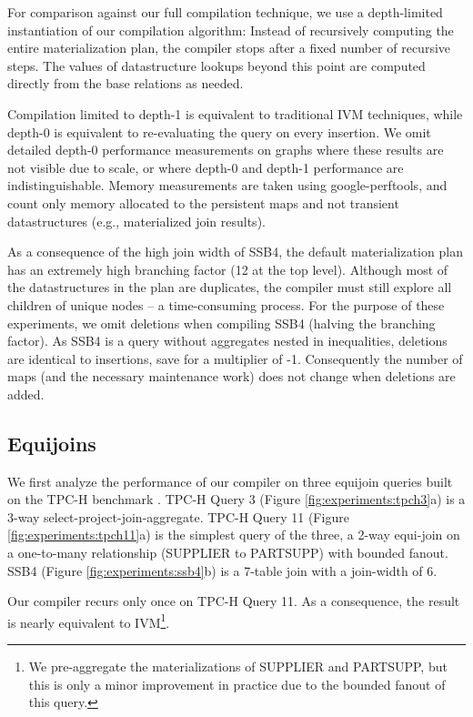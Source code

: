 For comparison against our full compilation technique, we use a depth-limited instantiation of our compilation algorithm: Instead of recursively computing the entire materialization plan, the compiler stops after a fixed number of recursive steps.  The values of datastructure lookups beyond this point are computed directly from the base relations as needed.

Compilation limited to depth-1 is equivalent to traditional IVM techniques, while depth-0 is equivalent to re-evaluating the query on every insertion.  We omit detailed depth-0 performance measurements on graphs where these results are not visible due to scale, or where depth-0 and depth-1 performance are indistinguishable.  Memory measurements are taken using google-perftools\cite{perftools}, and count only memory allocated to the persistent maps and not transient datastructures (e.g., materialized join results).

As a consequence of the high join width of SSB4, the default materialization plan has an extremely high branching factor (12 at the top level).  Although most of the datastructures in the plan are duplicates, the compiler must still explore all children of unique nodes -- a time-consuming process.  For the purpose of these experiments, we omit deletions when compiling SSB4 (halving the branching factor).  As SSB4 is a query without aggregates nested in inequalities, deletions are identical to insertions, save for a multiplier of -1.  Consequently the number of maps (and the necessary maintenance work) does not change when deletions are added.

\subsection{Equijoins}

We first analyze the performance of our compiler on three equijoin queries built on the TPC-H benchmark .  TPC-H Query 3 (Figure \ref{fig:experiments:tpch3}a) is a 3-way select-project-join-aggregate.  TPC-H Query 11 (Figure \ref{fig:experiments:tpch11}a) is the simplest query of the three, a 2-way equi-join on a one-to-many relationship (SUPPLIER to PARTSUPP) with bounded fanout.  SSB4 (Figure \ref{fig:experiments:ssb4}b) is a 7-table join with a join-width of 6.  

Our compiler recurs only once on TPC-H Query 11.  As a consequence, the result is nearly equivalent to IVM\footnote{We pre-aggregate the materializations of SUPPLIER and PARTSUPP, but this is only a minor improvement in practice due to the bounded fanout of this query.}.  

